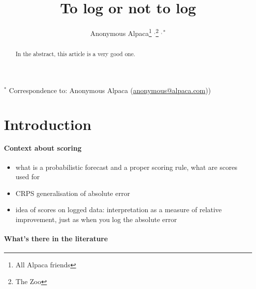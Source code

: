 \documentclass{article}
\begin{document}
\title{To log or not to log}
  \author{Anonymous Alpaca\thanks{All Alpaca friends} $^{,}$\thanks{The Zoo} $^{ , *}$}

\maketitle

\begin{abstract}
In the abstract, this article is a very good one. 
\end{abstract}

\bigskip

{\footnotesize $^*$ Correspondence to: Anonymous Alpaca (\url{anonymous@alpaca.com}))}



\newpage


\section{Introduction}

\paragraph{Context about scoring}

\begin{itemize}
    \item what is a probabilistic forecast and a proper scoring rule, what are scores used for
    \item CRPS generalisation of absolute error
    \item idea of scores on logged data: interpretation as a measure of relative improvement, just as when you log the absolute error
\end{itemize}

\paragraph{What's there in the literature}
\end{document}
